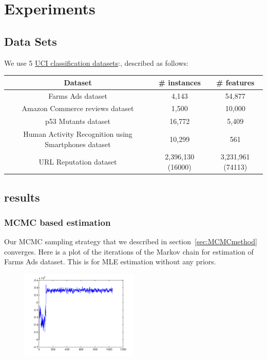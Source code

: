 \section{Experiments}
\label{sec:experiments}

\subsection{Data Sets}


We use 5 \href{http://archive.ics.uci.edu/ml/datasets.html}{UCI classification
datasets}:, described as follows:

\begin{tabular}{| c | c |  c |}
\hline
Dataset & \# instances & \# features \\
\hline
Farms Ads dataset & 4,143 & 54,877 \\
\hline
Amazon Commerce reviews dataset & 1,500 & 10,000 \\
\hline
p53 Mutants dataset & 16,772 & 5,409 \\
\hline
Human Activity Recognition using Smartphones dataset & 10,299 & 561\\
\hline
URL Reputation dataset\footnotemark[1] & 2,396,130 (16000) & 3,231,961 (74113) \\
\hline
\end{tabular}


\subsection{results}
\subsubsection{MCMC based estimation}
Our MCMC sampling strategy that we described in section~\ref{sec:MCMCmethod}
converges. Here is a plot of the iterations of the Markov chain for estimation
of Farms Ads dataset. This is for MLE estimation without any priors. 

\begin{figure}
\includegraphics[width=0.5\textwidth]{samplingConvergence.png}
\end{figure}
